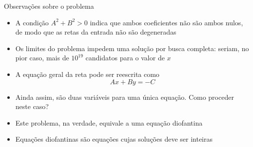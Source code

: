 \begin{frame}[fragile]{Observações sobre o problema}

    \begin{itemize}
        \item A condição $A^2 + B^2 > 0$ indica que ambos coeficientes não são ambos nulos,
            de modo que as retas da entrada não são degeneradas
        \pause

        \item Os limites do problema impedem uma solução por busca completa: seriam, no pior 
            caso, mais de $10^{19}$ candidatos para o valor de $x$
        \pause

        \item A equação geral da reta pode ser reescrita como
        \[
            Ax + By = -C
        \]
        \pause

        \item Ainda assim, são duas variáveis para uma única equação. Como proceder neste
            caso? 
        \pause

        \item Este problema, na verdade, equivale a uma equação diofantina
        \pause

        \item Equações diofantinas são equações cujas soluções deve ser inteiras
    \end{itemize}

\end{frame}


